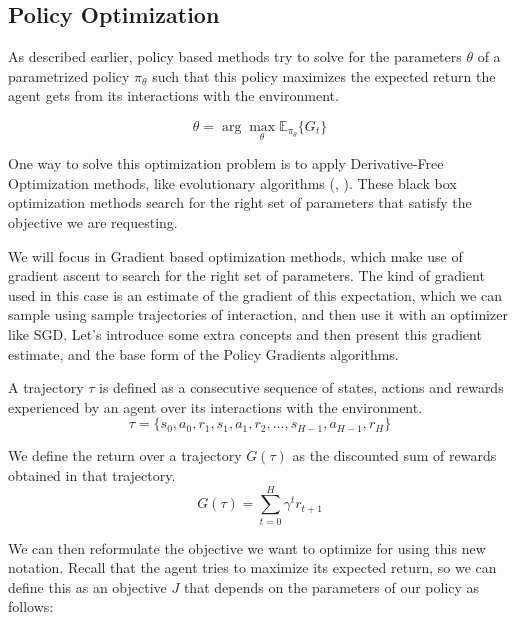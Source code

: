 \subsection{Policy Optimization}
\label{subsec:ch2_policyBasedMethods}

As described earlier, policy based methods try to solve for the parameters $\theta$
of a parametrized policy $\pi_{\theta}$ such that this policy maximizes the expected
return the agent gets from its interactions with the environment.

\begin{equation}
    \theta = \arg \max_\theta \mathbb{E}_{\pi_{\theta}} \lbrace G_{t} \rbrace
\end{equation}

One way to solve this optimization problem is to apply Derivative-Free Optimization
methods, like evolutionary algorithms (\citet{CMA}, \citet{ESopenai}). These black 
box optimization methods search for the right set of parameters that satisfy the 
objective we are requesting.

We will focus in Gradient based optimization methods, which make use of gradient
ascent to search for the right set of parameters. The kind of gradient used in this
case is an estimate of the gradient of this expectation, which we can sample
using sample trajectories of interaction, and then use it with an optimizer like
SGD. Let's introduce some extra concepts and then present this gradient estimate,
and the base form of the Policy Gradients algorithms.

\begin{definition}
    A trajectory $\tau$ is defined as a consecutive sequence of states, actions 
    and rewards experienced by an agent over its interactions with the environment.
    \begin{equation}
        \tau = \lbrace s_{0},a_{0},r_{1},s_{1},a_{1},r_{2},\hdots,s_{H-1},a_{H-1},r_{H} \rbrace
    \end{equation}
\end{definition}

\begin{definition}
    We define the return over a trajectory $G(\tau)$ as the discounted sum of
    rewards obtained in that trajectory.
    \begin{equation}
        G(\tau) = \sum_{t=0}^{H} \gamma^{t} r_{t+1}
    \end{equation}
\end{definition}

We  can then reformulate the objective we want to optimize for using this new notation.
Recall that the agent tries to maximize its expected return, so we can define this as
an objective $J$ that depends on the parameters of our policy as follows:

